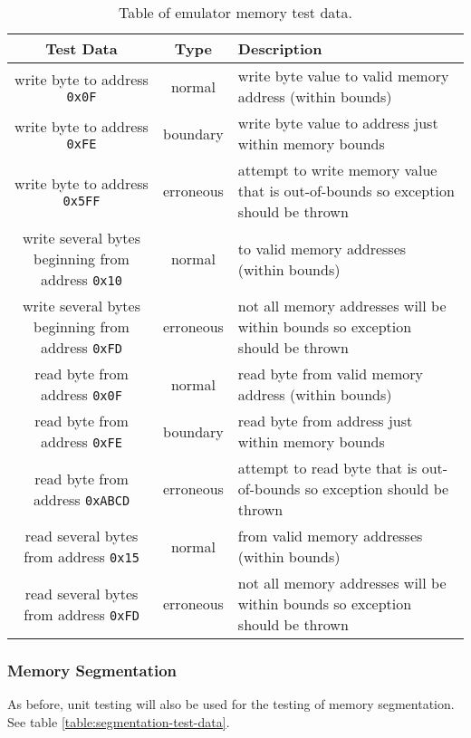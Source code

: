         \begin{table}
            \begin{tabular}{ | c | c | m{} | }
                \hline
                Test Data & Type & Description \\
                \hline
                write byte to address \texttt{0x0F} & normal & write byte value to valid memory address (within bounds) \\
                write byte to address \texttt{0xFE} & boundary & write byte value to address just within memory bounds \\
                write byte to address \texttt{0x5FF} & erroneous & attempt to write memory value that is out-of-bounds so exception should be thrown \\
                write several bytes beginning from address \texttt{0x10} & normal & to valid memory addresses (within bounds) \\
                write several bytes beginning from address \texttt{0xFD} & erroneous & not all memory addresses will be within bounds so exception should be thrown \\
                read byte from address \texttt{0x0F} & normal & read byte from valid memory address (within bounds) \\
                read byte from address \texttt{0xFE} & boundary & read byte from address just within memory bounds \\
                read byte from address \texttt{0xABCD} & erroneous & attempt to read byte that is out-of-bounds so exception should be thrown \\
                read several bytes from address \texttt{0x15} & normal & from valid memory addresses (within bounds) \\
                read several bytes from address \texttt{0xFD} & erroneous & not all memory addresses will be within bounds so exception should be thrown \\
                \hline
            \end{tabular}
            \label{table:memory-test-data}
            \caption{Table of emulator memory test data.}
        \end{table}

    \subsubsection{Memory Segmentation}
        As before, unit testing will also be used for the testing of memory segmentation. See table \ref{table:segmentation-test-data}.

